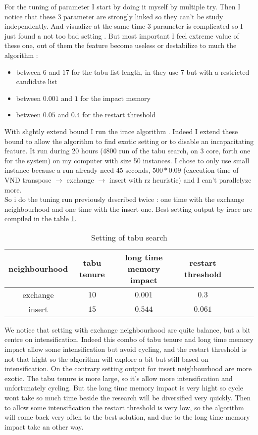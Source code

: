 \documentclass[12pt,a4paper]{article}
\begin{document}
For the tuning of parameter I start by doing it myself by multiple try. Then I notice that these 3 parameter are strongly linked so they can't be study independently. And visualize at the same time 3 parameter is complicated so I just found a not too bad setting . But most important I feel extreme value of these one, out of them the feature become useless or destabilize to much the algorithm :
\begin{itemize}
\item
between $6$ and $17$ for the tabu list length, in \cite{Tseng2010121} they use 7 but with a restricted candidate list
\item
between $0.001$ and $1$ for the impact memory
\item
between $0.05$ and $0.4$ for the restart threshold
\end{itemize}
With slightly extend bound I run the irace algorithm \cite{irace}. Indeed I extend these bound to allow the algorithm to find exotic setting or to disable an incapacitating feature. It run during 20 hours (4800 run of the tabu search, on 3 core, forth one for the system) on my computer with size 50 instances. I chose to only use small instance because a run already need 45 seconds, $500 * 0.09$ (execution time of VND transpose $\rightarrow$ exchange $\rightarrow$ insert with rz heuristic) and I can't parallelyze more.\\

So i do the tuning run previously described twice : one time with the exchange neighbourhood and one time with the insert one. Best setting output by irace are compiled in the table \ref{Setting of tabu search}.

\begin{table}[!h]
\centering
\begin{tabular}{|*{7}{c|}}
  \hline
  neighbourhood & tabu tenure & long time memory impact & restart threshold \\
  \hline
  exchange & $10$ & $0.001$ & $0.3$ \\ 
  insert & $15$ & $0.544$ & $0.061$ \\
  \hline
\end{tabular}
\caption{Setting of tabu search}
\label{Setting of tabu search}
\end{table}

We notice that setting with exchange neighbourhood are quite balance, but a bit centre on intensification. Indeed this combo of tabu tenure and long time memory impact allow some intensification but avoid cycling, and the restart threshold is not that hight so the algorithm will explore a bit but still based on intensification. On the contrary setting output for insert neighbourhood are more exotic. The tabu tenure is more large, so it's allow more intensification and unfortunately cycling. But the long time memory impact is very hight so cycle wont take so much time beside the research will be diversified very quickly. Then to allow some intensification the restart threshold is very low, so the algorithm will come back very often to the best solution, and due to the long time memory impact take an other way.
\end{document}
